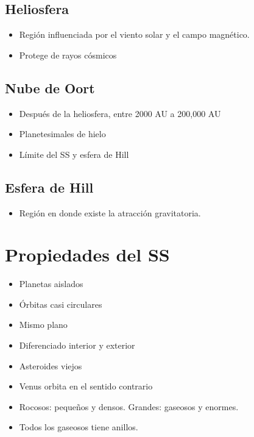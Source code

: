 \documentclass[11pt,fleqn]{book} %
\begin{document}
\subsection{Heliosfera}
\begin{itemize}
    \item Región influenciada por el viento solar y el campo magnético. 
    \item Protege de rayos cósmicos 
\end{itemize}

\subsection{Nube de Oort}
\begin{itemize}
    \item Después de la heliosfera, entre 2000 AU a 200,000 AU 
    \item Planetesimales de hielo 
    \item Límite del SS y esfera de Hill 
    
\end{itemize}

\subsection{Esfera de Hill}
\begin{itemize}
    \item Región en donde existe la atracción gravitatoria. 
\end{itemize}

\section{Propiedades del SS}
\begin{itemize}
    \item Planetas aislados
    \item Órbitas casi circulares
    \item Mismo plano 
    \item Diferenciado interior y exterior
    \item Asteroides viejos 
    \item Venus orbita en el sentido contrario 
    \item Rocosos: pequeños y densos. Grandes: gaseosos y enormes. 
    \item Todos los gaseosos tiene anillos. 
\end{itemize}

\end{document}
